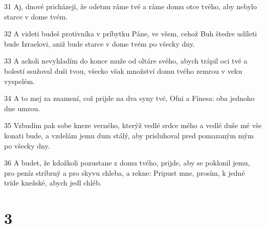 \par 31 Aj, dnové pricházejí, že odetnu ráme tvé a ráme domu otce tvého, aby nebylo starce v dome tvém.
\par 32 A videti budeš protivníka v príbytku Páne, ve všem, cehož Buh štedre udíleti bude Izraelovi, aniž bude starce v dome tvém po všecky dny.
\par 33 A ackoli nevyhladím do konce muže od oltáre svého, abych trápil oci tvé a bolestí ssužoval duši tvou, všecko však množství domu tvého zemrou v veku vyspelém.
\par 34 A to mej za znamení, což prijde na dva syny tvé, Ofni a Fínesa: oba jednoho dne umrou.
\par 35 Vzbudím pak sobe kneze verného, kterýž vedlé srdce mého a vedlé duše mé vše konati bude, a vzdelám jemu dum stálý, aby prisluhoval pred pomazaným mým po všecky dny.
\par 36 A budet, že kdožkoli pozustane z domu tvého, prijde, aby se poklonil jemu, pro peníz stríbrný a pro skyvu chleba, a rekne: Pripust mne, prosím, k jedné tríde knežské, abych jedl chléb.

\chapter{3}

